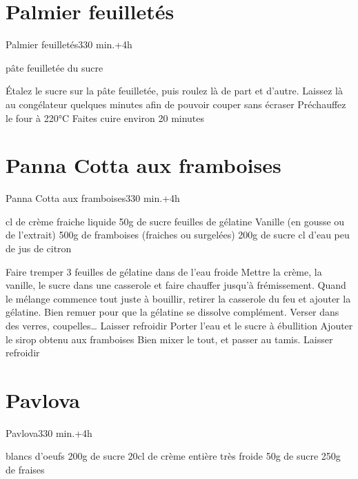 {\section{Palmier feuilletés}
\begin{recette}{Palmier feuilletés}{3}{30 min.+4h}{}
\begin{ingredients}
 pâte feuilletée
\ingredient du sucre
\end{ingredients}

\begin{preparation}
\etape Étalez le sucre sur la pâte feuilletée, puis roulez là de part et d'autre. 
\etape Laissez là au congélateur quelques minutes afin de pouvoir couper sans écraser
\etape Préchauffez le four à 220°C
\etape Faites cuire environ 20 minutes
\end{preparation}
\end{recette}

\section{Panna Cotta aux framboises}
\begin{recette}{Panna Cotta aux framboises}{3}{30 min.+4h}{}
\begin{ingredients}
 cl de crème fraiche liquide
\ingredient 50g de sucre
 feuilles de gélatine
\ingredient Vanille (en gousse ou de l'extrait)
\ingredient[Coulis]
\ingredient 500g de framboises (fraiches ou surgelées)
\ingredient 200g de sucre
 cl d'eau
 peu de jus de citron
\end{ingredients}

\begin{preparation}
\etape Faire tremper 3 feuilles de gélatine dans de l'eau froide
\etape Mettre la crème, la vanille, le sucre dans une casserole et faire chauffer jusqu'à frémissement.
\etape Quand le mélange commence tout juste à bouillir, retirer la casserole du feu et ajouter la gélatine. Bien remuer pour que 
la gélatine se dissolve complément.
\etape Verser dans des verres, coupelles…
\etape Laisser refroidir
\etape Porter l'eau et le sucre à ébullition
\etape Ajouter le sirop obtenu aux framboises
\etape Bien mixer le tout, et passer au tamis.
\etape Laisser refroidir
\end{preparation}
\end{recette}

\section{Pavlova}
\begin{recette}{Pavlova}{3}{30 min.+4h}{}
\begin{ingredients}
\ingredient[meringue]
 blancs d'oeufs
\ingredient 200g de sucre
\ingredient[chantilly]
\ingredient 20cl de crème entière très froide
\ingredient 50g de sucre
\ingredient[garniture]
\ingredient 250g de fraises
\end{ingredients}


\end{recette}}
